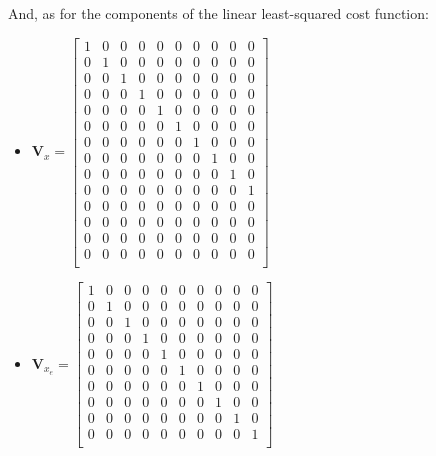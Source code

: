 \documentclass{thesisreport}
\begin{document}
\newpage

And, as for the components of the linear least-squared cost function:
\begin{multicols}{2}
\begin{itemize}
	\item $\bm{V}_x = \begin{bmatrix}
	1 & 0 & 0 & 0 & 0 & 0 & 0 & 0 & 0 & 0 \\
	0 & 1 & 0 & 0 & 0 & 0 & 0 & 0 & 0 & 0 \\
	0 & 0 & 1 & 0 & 0 & 0 & 0 & 0 & 0 & 0 \\
	0 & 0 & 0 & 1 & 0 & 0 & 0 & 0 & 0 & 0 \\
	0 & 0 & 0 & 0 & 1 & 0 & 0 & 0 & 0 & 0 \\
	0 & 0 & 0 & 0 & 0 & 1 & 0 & 0 & 0 & 0 \\
	0 & 0 & 0 & 0 & 0 & 0 & 1 & 0 & 0 & 0 \\
	0 & 0 & 0 & 0 & 0 & 0 & 0 & 1 & 0 & 0 \\
	0 & 0 & 0 & 0 & 0 & 0 & 0 & 0 & 1 & 0 \\
	0 & 0 & 0 & 0 & 0 & 0 & 0 & 0 & 0 & 1 \\
	0 & 0 & 0 & 0 & 0 & 0 & 0 & 0 & 0 & 0 \\
	0 & 0 & 0 & 0 & 0 & 0 & 0 & 0 & 0 & 0 \\
	0 & 0 & 0 & 0 & 0 & 0 & 0 & 0 & 0 & 0 \\
	0 & 0 & 0 & 0 & 0 & 0 & 0 & 0 & 0 & 0 \\
	\end{bmatrix}$
	
	\item $\bm{V}_{x_e} = \begin{bmatrix}
	1 & 0 & 0 & 0 & 0 & 0 & 0 & 0 & 0 & 0 \\
	0 & 1 & 0 & 0 & 0 & 0 & 0 & 0 & 0 & 0 \\
	0 & 0 & 1 & 0 & 0 & 0 & 0 & 0 & 0 & 0 \\
	0 & 0 & 0 & 1 & 0 & 0 & 0 & 0 & 0 & 0 \\
	0 & 0 & 0 & 0 & 1 & 0 & 0 & 0 & 0 & 0 \\
	0 & 0 & 0 & 0 & 0 & 1 & 0 & 0 & 0 & 0 \\
	0 & 0 & 0 & 0 & 0 & 0 & 1 & 0 & 0 & 0 \\
	0 & 0 & 0 & 0 & 0 & 0 & 0 & 1 & 0 & 0 \\
	0 & 0 & 0 & 0 & 0 & 0 & 0 & 0 & 1 & 0 \\
	0 & 0 & 0 & 0 & 0 & 0 & 0 & 0 & 0 & 1 \\
	\end{bmatrix}$
	

\end{itemize}
\end{multicols}
\end{document}
